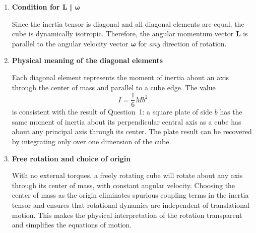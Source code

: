 \documentclass[12pt]{article}
\begin{document}
\begin{enumerate}
\begin{enumerate}
\item \textbf{Condition for $\boldsymbol L \parallel \boldsymbol\omega$}

Since the inertia tensor is diagonal and all diagonal elements are equal, the cube is dynamically isotropic.  
Therefore, the angular momentum vector $\boldsymbol L$ is parallel to the angular velocity vector $\boldsymbol\omega$ for \emph{any} direction of rotation.

\item \textbf{Physical meaning of the diagonal elements}

Each diagonal element represents the moment of inertia about an axis through the center of mass and parallel to a cube edge.  
The value
\[
I=\frac{1}{6}Mb^2
\]
is consistent with the result of Question~1: a square plate of side $b$ has the same moment of inertia about its perpendicular central axis as a cube has about any principal axis through its center. The plate result can be recovered by integrating only over one dimension of the cube.

\item \textbf{Free rotation and choice of origin}

With no external torques, a freely rotating cube will rotate about any axis through its center of mass, with constant angular velocity.  
Choosing the center of mass as the origin eliminates spurious coupling terms in the inertia tensor and ensures that rotational dynamics are independent of translational motion. This makes the physical interpretation of the rotation transparent and simplifies the equations of motion.

\end{enumerate}

\end{enumerate}
\end{document}
